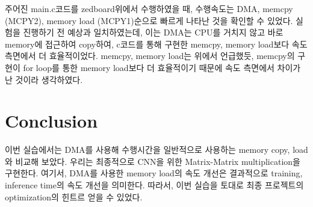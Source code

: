 \documentclass{article}
\begin{document}
주어진 main.c코드를 zedboard위에서 수행하였을 때, 수행속도는 DMA, memcpy (MCPY2), memory load (MCPY1)순으로 빠르게 나타난 것을 확인할 수 있었다. 실험을 진행하기 전 예상과 일치하였는데, 이는 DMA는 CPU를 거치지 않고 바로 memory에 접근하여 copy하여, c코드를 통해 구현한 memcpy, memory load보다 속도 측면에서 더 효율적이었다.
memcpy, memory load는 위에서 언급했듯, memcpy의 구현이 for loop를 통한 memory load보다 더 효율적이기 때문에 속도 측면에서 차이가 난 것이라 생각하였다.

\section{Conclusion}
이번 실습에서는 DMA를 사용해 수행시간을 일반적으로 사용하는 memory copy, load와 비교해 보았다.
우리는 최종적으로 CNN을 위한 Matrix-Matrix multiplication을 구현한다. 여기서, DMA를 사용한 memory load의 속도 개선은 결과적으로 training, inference time의 속도 개선을 의미한다. 따라서, 이번 실습을 토대로 최종 프로젝트의 optimization의 힌트르 얻을 수 있었다.



\end{document}

